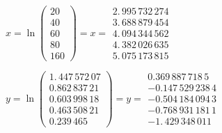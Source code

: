\documentclass{article}
\begin{document}
\bigskip

\bigskip $x=\ln (%
\begin{array}{c}
20 \\ 
40 \\ 
60 \\ 
80 \\ 
160%
\end{array}%
)=\allowbreak x=%
\begin{array}{c}
2.\,\allowbreak 995\,732\,274 \\ 
3.\,\allowbreak 688\,879\,454 \\ 
4.\,\allowbreak 094\,344\,562 \\ 
4.\,\allowbreak 382\,026\,635 \\ 
5.\,\allowbreak 075\,173\,815%
\end{array}%
\allowbreak $

$y=\ln (%
\begin{array}{c}
1.\,\allowbreak 447\,572\,07 \\ 
\allowbreak 0.862\,837\,21 \\ 
\allowbreak 0.603\,998\,18 \\ 
\allowbreak 0.463\,508\,21 \\ 
\allowbreak 0.239\,465\,%
\end{array}%
)=\allowbreak y=%
\begin{array}{c}
0.369\,887\,718\,\allowbreak 5 \\ 
-0.147\,529\,238\,\allowbreak 4 \\ 
-0.504\,184\,094\,\allowbreak 3 \\ 
-0.768\,931\,181\,\allowbreak 1 \\ 
-1.\,\allowbreak 429\,348\,011%
\end{array}%
\allowbreak $
\end{document}
